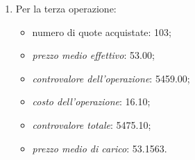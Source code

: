\documentclass[12pt,a4paper]{article}
\newcommand{\Eur}[1]{\SI{#1}{\text{\euro{}}}}
\newcommand{\MediaPonderataDue}[4]{\frac{\num{#1} \times{} \num{#2} + \num{#3} \times{} \num{#4}}{\num{#1} + \num{#3}}}
\begin{document}
\begin{enumerate}
  Dopo la seconda operazione:
  \begin{itemize}
  \item numero quote nel saldo: \(101 + 102 = 203\);
  \item  il \emph{prezzo  medio effettivo  nel saldo}  è la  media ponderata  dei \emph{prezzi  medi
       effettivi} del saldo precedente e del nuovo acquisto:
    \begin{equation*}
      \MediaPonderataDue{101}{51,00}{102}{52,00} = \Eur{51,5025}
    \end{equation*}
  \item il  \emph{prezzo medio di carico  nel saldo} è la  media ponderata dei \emph{prezzi  medi di
       carico} del saldo precedente e del nuovo acquisto:
    \begin{equation*}
      \MediaPonderataDue{101}{51,1521}{102}{52,1542} = \Eur{51,6556}
    \end{equation*}
  \end{itemize}
  il \emph{costo medio per quota nel saldo} risulta:
  \begin{equation*}
    \num{51,6556} - \num{51,5025} = \Eur{0,1532}
  \end{equation*}

\item Per la terza operazione:
  \begin{itemize}
  \item numero di quote acquistate: \num{103};
  \item \emph{prezzo medio effettivo}: \Eur{53,00};
  \item \emph{controvalore dell'operazione}: \Eur{5459,00};
  \item \emph{costo dell'operazione}: \Eur{16,10};
  \item \emph{controvalore totale}: \Eur{5475,10};
  \item \emph{prezzo medio di carico}: \Eur{53,1563}.
  \end{itemize}


\end{enumerate}
\end{document}
